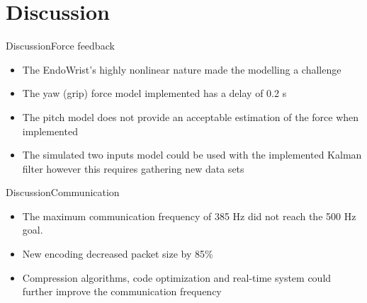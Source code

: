 \section{Discussion}

\begin{frame}{Discussion}{Force feedback}
	
	
	\begin{itemize}
		\item The EndoWrist's highly nonlinear nature made the modelling a challenge
		\item The yaw (grip) force model implemented has a delay of 0.2 s 
		\item The pitch model does not provide an acceptable estimation of the force when implemented
		\item The simulated two inputs model could be used with the implemented Kalman filter however this requires gathering new data sets
	\end{itemize}
	
	
\end{frame}

\begin{frame}{Discussion}{Communication}


  \begin{itemize}
  	\item The maximum communication frequency of 385 Hz did not reach the 500 Hz goal.
  	\item New encoding  decreased packet size by 85\%
  	\item Compression algorithms, code optimization and real-time system could further improve the communication frequency
   
  \end{itemize}


\end{frame}






